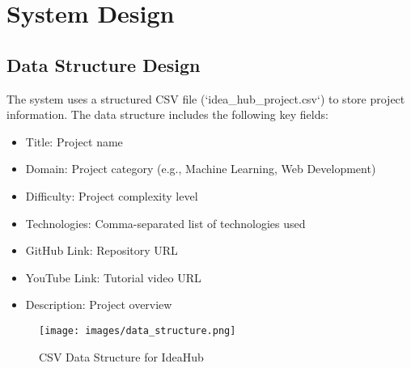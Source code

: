 \section{System Design}

\subsection{Data Structure Design}
The system uses a structured CSV file (`idea_hub_project.csv`) to store project information. The data structure includes the following key fields:
\begin{itemize}
    \item Title: Project name
    \item Domain: Project category (e.g., Machine Learning, Web Development)
    \item Difficulty: Project complexity level
    \item Technologies: Comma-separated list of technologies used
    \item GitHub Link: Repository URL
    \item YouTube Link: Tutorial video URL
    \item Description: Project overview
\end{itemize}

\begin{figure}[H]
\centering
\texttt{[image: images/data\_structure.png]}
\caption{CSV Data Structure for IdeaHub}
\end{figure}

